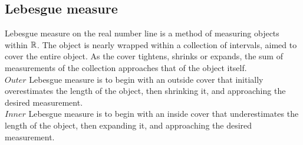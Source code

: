 \documentclass[11pt]{ekblite}
\begin{document}
\subsection{Lebesgue measure}
Lebesgue measure on the real number line is a method of measuring objects within $\mathbb{R}$. The object is nearly wrapped within a collection of intervals, aimed to cover the entire object. As the cover tightens, shrinks or expands, the sum of measurements of the collection approaches that of the object itself.
\\[0.2in]$\textit{Outer}$ Lebesgue measure is to begin with an outside cover that initially overestimates the length of the object, then shrinking it, and approaching the desired measurement.\cite{edgar}
\\[0.2in]$\textit{Inner}$ Lebesgue measure is to begin with an inside cover that underestimates the length of the object, then expanding it, and approaching the desired measurement.\cite{edgar}
\begin{definition}
	
\end{definition}

\newpage
\end{document}
